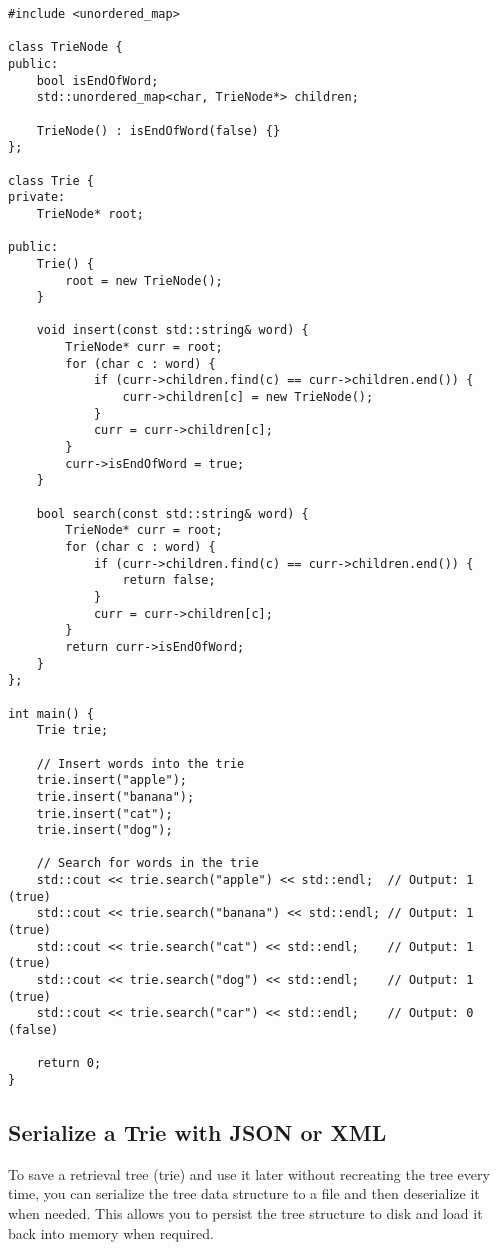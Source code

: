 \documentclass[openany]{report}
\begin{document}
\begin{verbatim}
#include <unordered_map>

class TrieNode {
public:
    bool isEndOfWord;
    std::unordered_map<char, TrieNode*> children;

    TrieNode() : isEndOfWord(false) {}
};

class Trie {
private:
    TrieNode* root;

public:
    Trie() {
        root = new TrieNode();
    }

    void insert(const std::string& word) {
        TrieNode* curr = root;
        for (char c : word) {
            if (curr->children.find(c) == curr->children.end()) {
                curr->children[c] = new TrieNode();
            }
            curr = curr->children[c];
        }
        curr->isEndOfWord = true;
    }

    bool search(const std::string& word) {
        TrieNode* curr = root;
        for (char c : word) {
            if (curr->children.find(c) == curr->children.end()) {
                return false;
            }
            curr = curr->children[c];
        }
        return curr->isEndOfWord;
    }
};

int main() {
    Trie trie;
    
    // Insert words into the trie
    trie.insert("apple");
    trie.insert("banana");
    trie.insert("cat");
    trie.insert("dog");
    
    // Search for words in the trie
    std::cout << trie.search("apple") << std::endl;  // Output: 1 (true)
    std::cout << trie.search("banana") << std::endl; // Output: 1 (true)
    std::cout << trie.search("cat") << std::endl;    // Output: 1 (true)
    std::cout << trie.search("dog") << std::endl;    // Output: 1 (true)
    std::cout << trie.search("car") << std::endl;    // Output: 0 (false)

    return 0;
}
\end{verbatim}

\subsection{Serialize a Trie with JSON or XML}

To save a retrieval tree (trie) and use it later without recreating the tree every time, you can serialize the tree data structure to a file and then deserialize it when needed. This allows you to persist the tree structure to disk and load it back into memory when required.
\end{document}
